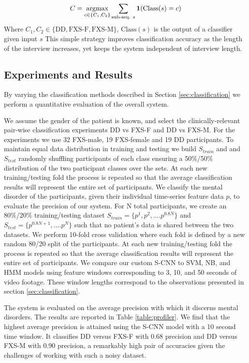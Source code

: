 \documentclass[10pt,twocolumn,letterpaper]{article}
\begin{document}
\begin{equation}
C = \underset{c \in \{C_1, C_2\}} {\operatorname{argmax}} \sum_{\text{sub-seq. } s}^{} \bold{1}(\text{Class}(s) = c)
\end{equation}
Where $C_1, C_2 \in \{\text{DD}, \text{FXS-F}, \text{FXS-M}\}$, $\text{Class}(s)$ is the output of a classifier given input $s$ This simple strategy improves classification accuracy as the length of the interview increases, yet keeps the system independent of interview length.

\subsection{Experiments and Results}

By varying the classification methods described in Section \ref{sec:classification} we perform a quantitative evaluation of the overall system.

We assume the gender of the patient is known, and select the clinically-relevant pair-wise classification experiments DD vs FXS-F and DD vs FXS-M. For the experiments we use 32 FXS-male, 19 FXS-female and 19 DD participants. To maintain equal data distribution in training and testing we build $S_{train}$ and and $S_{test}$ randomly shuffling participants of each class ensuring a 50\%/50\% distribution of the two participant classes over the sets. At each new training/testing fold the process is repeated so that the average classification results will represent the entire set of participants. We classify the mental disorder of the participants, given their individual time-series feature data $p$, to evaluate the precision of our system. For N total participants, we create an 80\%/20\% training/testing dataset $S_{train} = \{ p^1, p^2, .... p^{0.8 N} \}$ and $S_{test} = \{ p^{0.8N + 1}, .... p^N \}$  such that no patient's data is shared between the two datasets. We perform 10-fold cross validation where each fold is defined by a new random 80/20 split of the participants. At each new training/testing fold the process is repeated so that the average classification results will represent the entire set of participants. We compare our custom S-CNN to SVM, NB, and HMM models using feature windows corresponding to 3, 10, and 50 seconds of video footage. These window lengths correspond to the observations presented in section \ref{sec:classification}.

The system is evaluated on the average precision with which it discerns mental disorders. The results are reported in Table  \ref{table:profiler}. We find that the highest average precision is attained using the S-CNN model with a 10 second time window. It classifies DD versus FXS-F with 0.68 precision and DD versus FXS-M with 0.90 precision, a remarkably high pair of accuracies given the challenges of working with such a noisy dataset. 
\end{document}
